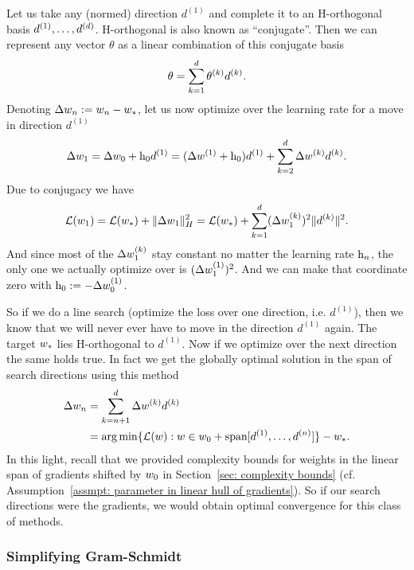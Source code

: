 Let us take any (normed) direction \(d^{(1)}\) and complete it to an H-orthogonal
basis \(d^{(1)},\dots,d^{(d)}\). H-orthogonal is also known as
``conjugate''. Then we can represent any vector \(\theta\) as a linear
combination of this conjugate basis
\begin{align*}
	\theta = \sum_{k=1}^d \theta^{(k)} d^{(k)}.
\end{align*}
Denoting \(\Delta w_n := w_n -w_*\), let us now optimize over
the learning rate for a move in direction \(d^{(1)}\)
\begin{align*}
	\Delta w_{1} = \Delta w_0 + \text{h}_0 d^{(1)}
	= (\Delta w^{(1)} + \text{h}_0)d^{(1)}
	+ \sum_{k=2}^d \Delta w^{(k)} d^{(k)}.
\end{align*}
Due to conjugacy we have
\begin{align*}
	\mathcal{L}(w_{1})
	= \mathcal{L}(w_*) + \|\Delta w_{1}\|_H^2
	= \mathcal{L}(w_*) + \sum_{k=1}^{d} (\Delta w_{1}^{(k)})^2\|d^{(k)}\|^2.
\end{align*}
And since most of the \(\Delta w^{(k)}_{1}\) stay constant no matter the
learning rate \(\text{h}_n\), the only one we actually optimize over is
\((\Delta w^{(1)}_{1})^2\).
And we can make that coordinate zero with \(\text{h}_0 :=-\Delta w_0^{(1)}\).

So if we do a line search (optimize the loss over one direction, i.e. \(d^{(1)}\)),
then we know that we will never ever have to move in the direction \(d^{(1)}\)
again. The target \(w_*\) lies H-orthogonal to \(d^{(1)}\). Now if we
optimize over the next direction the same holds true. In fact we get the globally
optimal solution in the span of search directions using this method 
\begin{align*}
	\Delta w_n &= \sum_{k=n+1}^d\Delta w^{(k)} d^{(k)}\\
	&= \arg\min \{
		\mathcal{L}(w) : w \in w_0 + \text{span}[d^{(1)},\dots, d^{(n)}]
	\} - w_*.
\end{align*}
In this light, recall that we provided complexity bounds for weights in the
linear span of gradients shifted by \(w_0\) in Section~\ref{sec: complexity bounds}
(cf. Assumption~\ref{assmpt: parameter in linear hull of gradients}). So if our
search directions were the gradients, we would obtain optimal convergence for
this class of methods.

\subsubsection{Simplifying Gram-Schmidt}

